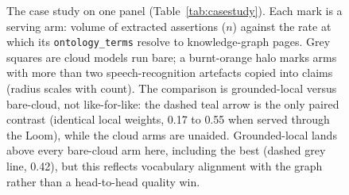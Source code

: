 \begin{figure}[t]
\caption{The case study on one panel (Table~\ref{tab:casestudy}). Each mark is a serving arm:
volume of extracted assertions ($n$) against the rate at which its \texttt{ontology\_terms}
resolve to knowledge-graph pages. Grey squares are cloud models run bare; a burnt-orange halo
marks arms with more than two speech-recognition artefacts copied into claims (radius scales
with count). The comparison is grounded-local versus bare-cloud, not like-for-like: the dashed
teal arrow is the only paired contrast (identical local weights, 0.17 to 0.55 when served through
the Loom), while the cloud arms are unaided. Grounded-local lands above every bare-cloud arm here,
including the best (dashed grey line, 0.42), but this reflects vocabulary alignment with the graph
rather than a head-to-head quality win.}
\label{fig:casestudy}
\end{figure}
